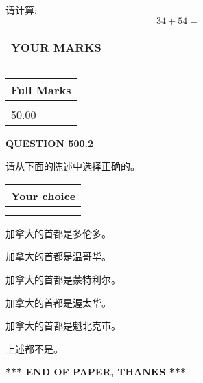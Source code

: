 \documentclass{ctexart}
\begin{document}
  
 
请计算:
\begin{equation}
34 +  %
54 = \nonumber
\end{equation}
 

 

 
  
\vspace{0.2in}
  
\noindent\begin{tabular}{|l|}
\hline
 YOUR MARKS  \\
\hline
 \\ 
 \\ 
\hline
\end{tabular}
\hspace{0.05in} \begin{tabular}{|l|}
\hline
 Full Marks  \\
\hline
 \\ 
50.00 \\
\hline
\end{tabular}
{\textbf{\Large{QUESTION
500.2 
}}}
  
  
请从下面的陈述中选择正确的。
  
  
\noindent\hspace{3.0in} \begin{tabular}{|l|}
\hline
Your choice \\
\hline
 \\ 
 \\ 
\hline
\end{tabular}
  
  
 
 
加拿大的首都是多伦多。
 
 
加拿大的首都是温哥华。
 
 
加拿大的首都是蒙特利尔。
 
 
加拿大的首都是渥太华。
 
 
加拿大的首都是魁北克市。
 
 
 上述都不是。
 
 
   
   
 \vspace{0.2in}
 
   
   
   
   
\vspace{1.0in} 
{\textbf{\large{ *** END OF PAPER, THANKS *** }}} 
   
\end{document}
